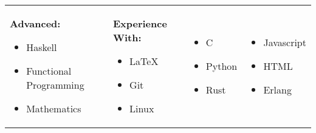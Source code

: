 \documentclass{letter}
\begin{document}
\begin{tabular}{p{}p{}p{}p{}}
  \textbf{Advanced:}
  \begin{itemize}
    \setlength\itemsep{0pt}
    \item Haskell
    \item Functional Programming
    \item Mathematics
  \end{itemize}

   &
  \textbf{Experience With:}
  \begin{itemize}
    \setlength\itemsep{0pt}
    \item \LaTeX{}
    \item Git
    \item Linux
  \end{itemize}

   &
  \begin{itemize}
    \setlength\itemsep{0pt}
    \item C
    \item Python
    \item Rust
  \end{itemize}

   &
  \begin{itemize}
    \setlength\itemsep{0pt}
    \item Javascript
    \item HTML
    \item Erlang
  \end{itemize}
\end{tabular}



\end{document}
